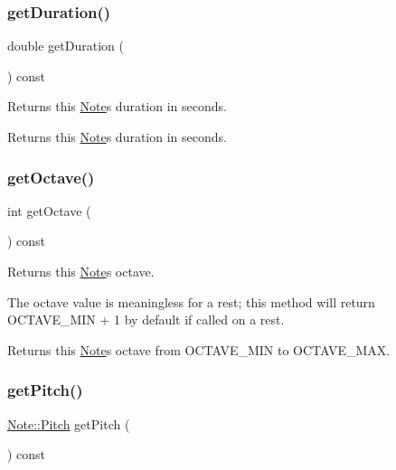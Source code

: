 \subsubsection{\texorpdfstring{get\+Duration()}{getDuration()}}
{\footnotesize\ttfamily double get\+Duration (\begin{DoxyParamCaption}{ }\end{DoxyParamCaption}) const}



Returns this \mbox{\hyperlink{classNote}{Note}}\textquotesingle{}s duration in seconds. 

\begin{DoxyReturn}{Returns}
this \mbox{\hyperlink{classNote}{Note}}\textquotesingle{}s duration in seconds. 
\end{DoxyReturn}
\mbox{\label{classNote_a276c3b157a7cfea998fb206395bcefc1}} 
\subsubsection{\texorpdfstring{get\+Octave()}{getOctave()}}
{\footnotesize\ttfamily int get\+Octave (\begin{DoxyParamCaption}{ }\end{DoxyParamCaption}) const}



Returns this \mbox{\hyperlink{classNote}{Note}}\textquotesingle{}s octave. 

The octave value is meaningless for a rest; this method will return O\+C\+T\+A\+V\+E\+\_\+\+M\+IN + 1 by default if called on a rest. \begin{DoxyReturn}{Returns}
this \mbox{\hyperlink{classNote}{Note}}\textquotesingle{}s octave from O\+C\+T\+A\+V\+E\+\_\+\+M\+IN to O\+C\+T\+A\+V\+E\+\_\+\+M\+AX. 
\end{DoxyReturn}
\mbox{\label{classNote_a4242384b0cb20e081da9e82c50591caa}} 
\subsubsection{\texorpdfstring{get\+Pitch()}{getPitch()}}
{\footnotesize\ttfamily \mbox{\hyperlink{classNote_a6753778520a0d8493f6c18f6e6818542}{Note\+::\+Pitch}} get\+Pitch (\begin{DoxyParamCaption}{ }\end{DoxyParamCaption}) const}




